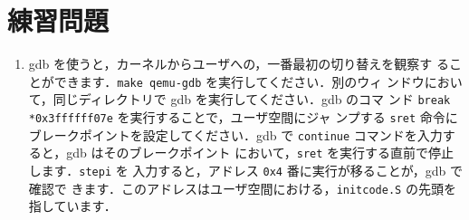 \section{練習問題}

\begin{enumerate}

\item gdb を使うと，カーネルからユーザへの，一番最初の切り替えを観察す
  ることができます．\texttt{make qemu-gdb} を実行してください．別のウィ
  ンドウにおいて，同じディレクトリで gdb を実行してください．gdb のコマ
  ンド \texttt{break *0x3ffffff07e} を実行することで，ユーザ空間にジャ
  ンプする \texttt{sret} 命令にブレークポイントを設定してください．gdb
  で \texttt{continue} コマンドを入力すると，gdb はそのブレークポイント
  において，\texttt{sret} を実行する直前で停止します．\texttt{stepi} を
  入力すると，アドレス \texttt{0x4} 番に実行が移ることが，gdb で確認で
  きます．このアドレスはユーザ空間における，\texttt{initcode.S} の先頭を
  指しています．


\end{enumerate}
